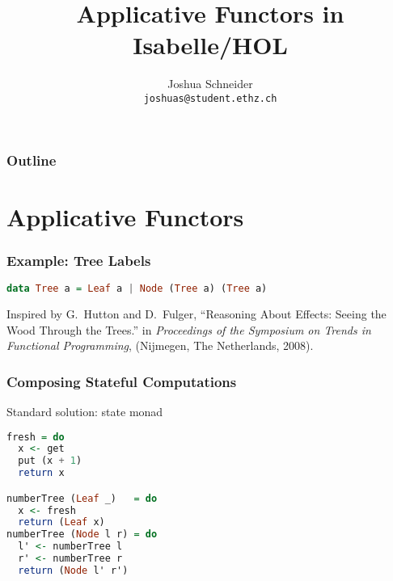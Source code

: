 \documentclass{beamer}
\title{Applicative Functors in Isabelle/HOL}
\author{Joshua Schneider \\ \texttt{joshuas@student.ethz.ch}}
\newenvironment{reference}{\begingroup\scriptsize}{\endgroup}
\begin{document}
\begin{frame}
\titlepage
\end{frame}

\begin{frame}
\frametitle{Outline}
\tableofcontents
\end{frame}

\section{Applicative Functors} %

\begin{frame}[fragile]
\frametitle{Example: Tree Labels}

\begin{lstlisting}[language=Haskell]
data Tree a = Leaf a | Node (Tree a) (Tree a)
\end{lstlisting}

\begin{center}\end{center}

\vspace{\fill}
\begin{reference}
Inspired by
G.\ Hutton and D.\ Fulger, ``Reasoning About Effects: Seeing the Wood Through the Trees.''
in \emph{Proceedings of the Symposium on Trends in Functional Programming}, (Nijmegen, The Netherlands, 2008).
\end{reference}
\end{frame}

\begin{frame}[fragile]
\frametitle{Composing Stateful Computations}
Standard solution: state monad
\vspace{5mm}
\begin{lstlisting}[language=Haskell]
fresh = do
  x <- get
  put (x + 1)
  return x

numberTree (Leaf _)   = do
  x <- fresh
  return (Leaf x)
numberTree (Node l r) = do
  l' <- numberTree l
  r' <- numberTree r
  return (Node l' r')
\end{lstlisting}
\end{frame}
\end{document}
